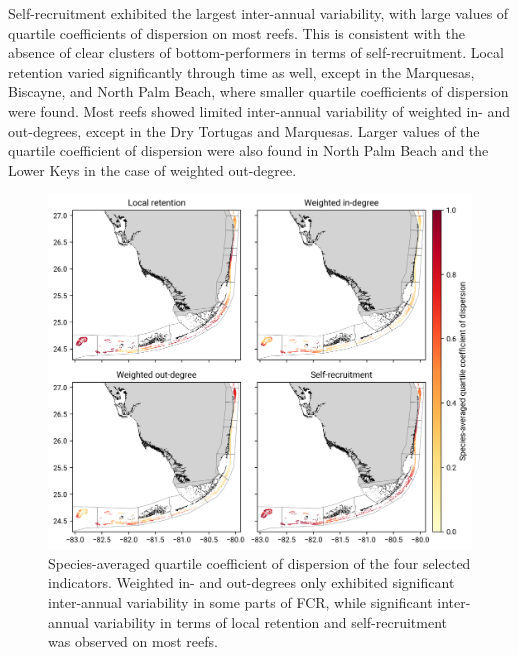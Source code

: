 \documentclass[preprint,12pt,authoryear]{elsarticle}
\begin{document}
Self-recruitment exhibited the largest inter-annual variability, with large values of quartile coefficients of dispersion on most reefs. This is consistent with the absence of clear clusters of bottom-performers in terms of self-recruitment. Local retention varied significantly through time as well, except in the Marquesas, Biscayne, and North Palm Beach, where smaller quartile coefficients of dispersion were found. Most reefs showed limited inter-annual variability of weighted in- and out-degrees, except in the Dry Tortugas and Marquesas. Larger values of the quartile coefficient of dispersion were also found in North Palm Beach and the Lower Keys in the case of weighted out-degree.
\begin{figure}
    \centering
    \includegraphics[width=\textwidth]{figures/species_averaged_quartile_coefficient_of_dispersion.png}
    \caption{Species-averaged quartile coefficient of dispersion of the four selected indicators. Weighted in- and out-degrees only exhibited significant inter-annual variability in some parts of FCR, while significant inter-annual variability in terms of local retention and self-recruitment was observed on most reefs.}\label{fig:variability}


\end{figure}
\end{document}
